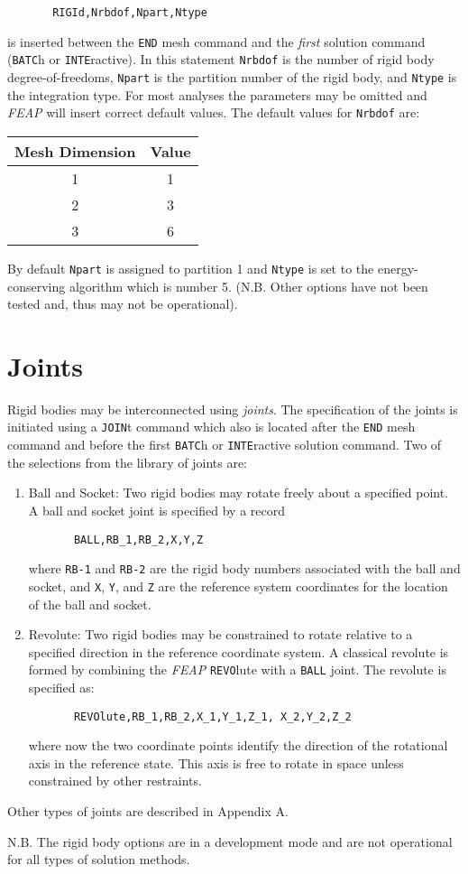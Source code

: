 \begin{verbatim}
       RIGId,Nrbdof,Npart,Ntype
\end{verbatim}
is inserted between the {\tt END} mesh command and the {\it first}
solution command ({\tt BATC}h or {\tt INTE}ractive).
In this statement {\tt Nrbdof} is the number of rigid body degree-of-freedoms,
{\tt Npart} is the partition number of the rigid body, and {\tt Ntype} is
the integration type.  For most analyses the parameters may be omitted and
{\sl FEAP} will insert correct default values.  The default values for
{\tt Nrbdof} are:
\begin{center}
\begin{tabular}{c | c}
Mesh Dimension & Value \\ \hline
  1 & 1 \\
  2 & 3 \\
  3 & 6 \\
\end{tabular}
\end{center}
By default {\tt Npart} is assigned to partition 1 and {\tt Ntype} is set
to the energy-conserving algorithm which is number 5. (N.B. Other options
have not been tested and, thus may not be operational).

\section{Joints}
\label{joint}

Rigid bodies may be interconnected using {\it joints}.
The specification of the joints is initiated using a {\tt JOIN}t command
which also is located after the {\tt END} mesh command and before the first
{\tt BATC}h or {\tt INTE}ractive solution command.  Two of the selections from
the library of joints are:
\begin{enumerate}
\item
Ball and Socket:  Two rigid bodies may rotate freely about a specified
point.  A ball and socket joint is specified by a record
\begin{verbatim}
       BALL,RB_1,RB_2,X,Y,Z
\end{verbatim}
where {\tt RB-1} and {\tt RB-2} are the rigid body numbers associated
with the ball and socket, and {\tt X}, {\tt Y}, and {\tt Z} are the reference
system coordinates for the location of the ball and socket.

\item
Revolute:  Two rigid bodies may be constrained to rotate relative to
a specified direction in the reference coordinate system.  A classical
revolute is formed by combining the {\sl FEAP} {\tt REVO}lute with a
{\tt BALL} joint. The revolute is specified as:
\begin{verbatim}
       REVOlute,RB_1,RB_2,X_1,Y_1,Z_1, X_2,Y_2,Z_2
\end{verbatim}
where now the two coordinate points identify the direction of the
rotational axis in the reference state.  This axis is free to rotate
in space unless constrained by other restraints.
\end{enumerate}

Other types of joints are described in Appendix A.

N.B. The rigid body options are in a development mode and are not
operational for all types of solution methods.
